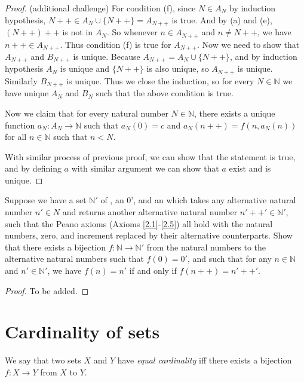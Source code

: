 \begin{proof}{(additional challenge)}
For condition (f), since \(N \in A_N\) by induction hypothesis, \(N++ \in A_N \cup \{N++\} = A_{N++}\) is true.
And by (a) and (e), \((N++)++\) is not in \(A_N\).
So whenever \(n \in A_{N++}\) and \(n \neq N++\), we have \(n++ \in A_{N++}\).
Thus condition (f) is true for \(A_{N++}\).
Now we need to show that \(A_{N++}\) and \(B_{N++}\) is unique.
Because \(A_{N++} = A_N \cup \{N++\}\), and by induction hypothesis \(A_N\) is unique and \(\{N++\}\) is also unique, so \(A_{N++}\) is unique.
Similarly \(B_{N++}\) is unique.
Thus we close the induction, so for every \(N \in \mathds{N}\) we have unique \(A_N\) and \(B_N\) such that the above condition is true.

Now we claim that for every natural number \(N \in \mathds{N}\), there exists a unique function \(a_N : A_N \to \mathds{N}\) such that \(a_N(0) = c\) and \(a_N(n++) = f(n, a_{N}(n))\) for all \(n \in \mathds{N}\) such that \(n < N\).

With similar process of previous proof, we can show that the statement is true, and by defining \(a\) with similar argument we can show that \(a\) exist and is unique.
\end{proof}

\begin{exercise}\label{exercise 3.5.13}
Suppose we have a set \(\mathds{N}'\) of , an  0', and an  which takes any alternative natural number \(n' \in N\) and returns another alternative natural number \(n'++' \in \mathds{N}'\), such that the Peano axioms (Axioms \ref{2.1}-\ref{2.5}) all hold with the natural numbers, zero, and increment replaced by their alternative counterparts.
Show that there exists a bijection \(f : \mathds{N} \to \mathds{N}'\) from the natural numbers to the alternative natural numbers such that \(f(0) = 0'\), and such that for any \(n \in \mathds{N}\) and \(n' \in \mathds{N}'\), we have \(f(n) = n'\) if and only if \(f(n++) = n'++'\).
\end{exercise}

\begin{proof}
To be added.
\end{proof}

\section{Cardinality of sets}

\begin{definition}\label{definition 3.6.1}
We say that two sets \(X\) and \(Y\) have \emph{equal cardinality} iff there exists a bijection \(f : X \to Y\) from \(X\) to \(Y\).
\end{definition}

